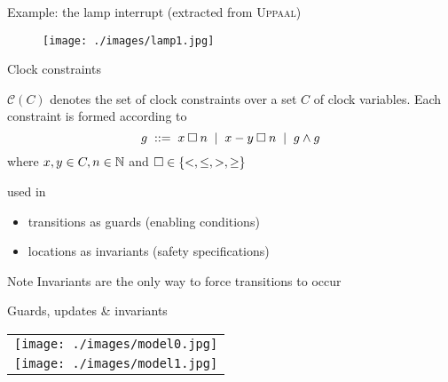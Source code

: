 \documentclass{beamer}
\def\dkb#1{{\blue #1}}
\def\uppaal{\textsc{Uppaal}}
\def\cc#1{\mathcal{C}(#1)}
\begin{document}
\begin{slide}{Example: the lamp interrupt}
\small
(extracted from \uppaal)

\begin{figure}[htb]
  \centering
  \texttt{[image: ./images/lamp1.jpg]}\\
\end{figure}

\end{slide}


\begin{slide}{Clock constraints}
\small

$\cc{C}$ denotes the  set of clock constraints over a set $C$ of clock variables.
Each constraint is formed according to 
\begin{equation*}
g \; ::=\; x \mathbin{\square} n \; \mid\; x - y \mathbin{\square} n  \; \mid\; g \mathbin{\wedge} g
\end{equation*}
where $x,y \in C, n \in \mathbb{N}$ and $\square \in \mathopen{ \{ }<,\leq,>,\geq\mathclose{ \} }$


used in
\begin{itemize}
\item  \dkb{transitions} as \dkb{guards} (enabling conditions)
\item  \dkb{locations} as \dkb{invariants} (safety specifications)
\end{itemize}

\begin{block}{Note}
Invariants are the \dkb{only} way to force transitions to occur
\end{block}
\end{slide}

\begin{slide}{Guards, updates \&  invariants}
\small


\begin{tabular}{c}
   \texttt{[image: ./images/model0.jpg]} \\  \texttt{[image: ./images/model1.jpg]}
\end{tabular}

\end{slide}
\end{document}
